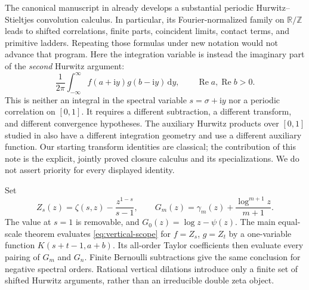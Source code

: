 \documentclass[11pt,a4paper]{article}
\theoremstyle{definition}
\numberwithin{equation}{section}
\newcommand{\R}{\mathbb R}
\newcommand{\Rea}{\operatorname{Re}}
\newcommand{\dd}{\,\mathrm d}
\newcommand{\ii}{\mathrm i}
\begin{document}
The canonical manuscript in \cite{repo} already develops a substantial
periodic Hurwitz--Stieltjes convolution calculus. In particular, its
Fourier-normalized family on $\R/\mathbb Z$ leads to shifted correlations,
finite parts, coincident limits, contact terms, and primitive ladders.
Repeating those formulas under new notation would not advance that program.
Here the integration variable is instead the imaginary part of the
\emph{second} Hurwitz argument:
\begin{equation}\label{eq:vertical-scope}
 \frac1{2\pi}\int_{-\infty}^{\infty}
       f(a+\ii y)g(b-\ii y)\dd y,
 \qquad \Rea a,\Rea b>0.
\end{equation}
This is neither an integral in the spectral variable $s=\sigma+\ii y$ nor
a periodic correlation on $[0,1]$. It requires a different subtraction,
a different transform, and different convergence hypotheses. The auxiliary
Hurwitz products over $[0,1]$ studied in \cite{shpot2016,shpot-paris} also
have a different integration geometry and use a different auxiliary
function. Our starting transform identities are classical; the contribution
of this note is the explicit, jointly proved closure calculus and its
specializations. We do not assert priority for every displayed identity.

Set
\begin{equation}\label{eq:Z-definition-intro}
 Z_s(z)=\zeta(s,z)-\frac{z^{1-s}}{s-1},
 \qquad
 G_m(z)=\gamma_m(z)+\frac{\log^{m+1}z}{m+1}.
\end{equation}
The value at $s=1$ is removable, and $G_0(z)=\log z-\psi(z)$.
The main equal-scale theorem evaluates \eqref{eq:vertical-scope} for
$f=Z_s$, $g=Z_t$ by a one-variable function $K(s+t-1,a+b)$.
Its all-order Taylor coefficients then evaluate every pairing of $G_m$
and $G_n$. Finite Bernoulli subtractions give the same conclusion for
negative spectral orders. Rational vertical dilations introduce only a
finite set of shifted Hurwitz arguments, rather than an irreducible double
zeta object.
\end{document}
